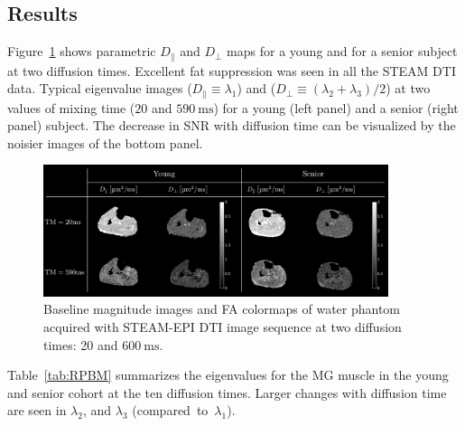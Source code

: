 \subsection{Results}
Figure~\ref{fig:STEAM_EV} shows parametric $D_\parallel$ and $D_\perp$ maps for a young and for a senior subject at two diffusion times.
Excellent fat suppression was seen in all the STEAM DTI data. 
Typical eigenvalue images ($D_\parallel \equiv \lambda_1$) and ($D_\perp \equiv (\lambda_2 + \lambda_3)/2$) at two values of mixing time ($20$ and $\SI{590}{\milli\second}$) for a young (left panel) and a senior (right panel) subject. 
The decrease in SNR with diffusion time can be visualized by the noisier images of the bottom panel. 
\begin{figure}[!htb]
\vspace{+0.2cm}
\centering
\includegraphics[width=0.9\textwidth]{Figures/STEAM_EV.pdf}
\caption[Baseline magnitude images and FA colormaps of water phantom acquired with STEAM-EPI DTI at two diffusion times]{Baseline magnitude images and FA colormaps of water phantom acquired with STEAM-EPI DTI image sequence at two diffusion times: 20 and $\SI{600}{\milli\second}$.}
\label{fig:STEAM_EV}
\end{figure}
Table~\ref{tab:RPBM} summarizes the eigenvalues for the MG muscle in the young and senior cohort at the ten diffusion times. 
Larger changes with diffusion time are seen in $\lambda_2$, and $\lambda_3$ (compared~to~$\lambda_1$). 
